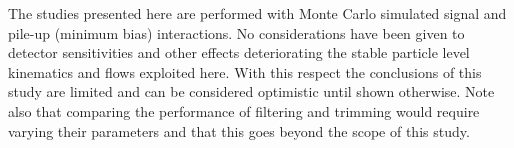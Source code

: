 The studies presented here are performed with Monte Carlo simulated signal and pile-up (minimum bias) interactions. No considerations have been given to detector sensitivities and other effects deteriorating the stable particle level kinematics and flows exploited here. With this respect the conclusions of this study are limited and can be considered optimistic until shown otherwise.     
%
Note also that comparing the performance of filtering and trimming
would require varying their parameters and that this goes beyond the
scope of this study.


%
%

%
